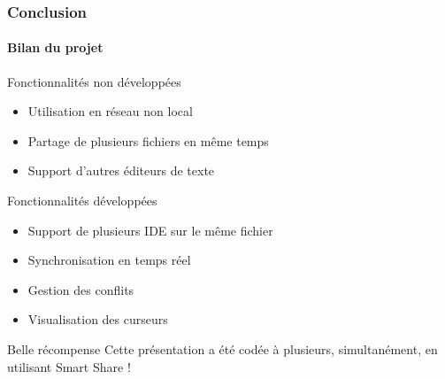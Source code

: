 \documentclass{beamer}
\begin{document}
\begin{frame}
    \frametitle{Conclusion}
    \framesubtitle{Bilan du projet}
    \begin{block}{Fonctionnalités non développées}
        \begin{itemize}
            \item Utilisation en réseau non local
            \item Partage de plusieurs fichiers en même temps
            \item Support d'autres éditeurs de texte
        \end{itemize}
    \end{block}
    \pause
    \begin{block}{Fonctionnalités développées}
        \begin{itemize}
            \item Support de plusieurs IDE sur le même fichier
            \item Synchronisation en temps réel
            \item Gestion des conflits
            \item Visualisation des curseurs
        \end{itemize}
    \end{block}
    \pause
    \begin{exampleblock}{Belle récompense}
        Cette présentation a été codée à plusieurs, simultanément, en utilisant Smart Share !
    \end{exampleblock}
\end{frame}
\end{document}
